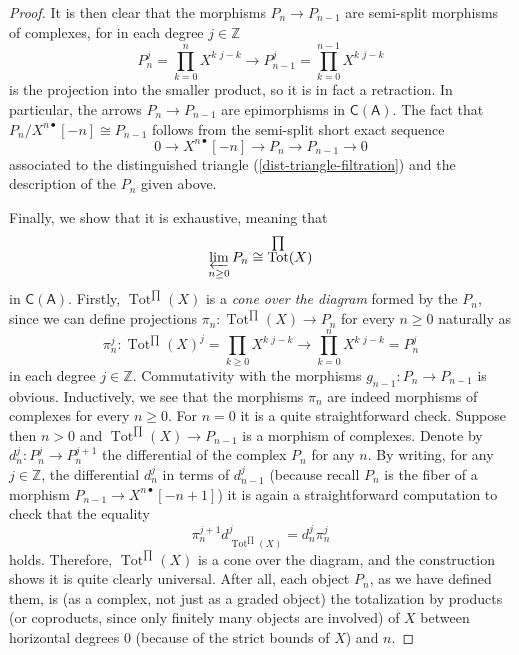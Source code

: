 \documentclass[reqno,11pt]{amsart}
\theoremstyle{plain}
\theoremstyle{remark}
\theoremstyle{definition}
\numberwithin{equation}{thm}
\newcommand{\SA}{\mathsf{A}}
\newcommand{\CCC}{\boldsymbol{\mathsf{C}}}
\newcommand{\ZZ}{\mathbb{Z}}
\newcommand{\lto}{\longrightarrow}
\DeclareMathOperator{\Tot}{Tot}
\begin{document}
\begin{proof}
		It is then clear that the morphisms $P_n \to P_{n-1}$ are semi-split morphisms of complexes, for in each degree $j \in \ZZ$
		\[
			P_n^j = \prod_{k=0}^{n} X^{k \,\, j-k} \lto P_{n-1}^j = \prod_{k=0}^{n-1} X^{k \,\, j-k}
		\]is the projection into the smaller product, so it is in fact a retraction. In particular, the arrows $P_n \to P_{n-1}$ are epimorphisms in $\CCC(\SA)$. The fact that $P_n/X^{n\bullet} [-n] \cong P_{n-1}$ follows from the semi-split short exact sequence 
		\[
		 0 \lto X^{n \bullet}[-n] \lto P_n \lto P_{n-1} \lto 0
		\]
		associated to the distinguished triangle (\ref{dist-triangle-filtration})
		and the description of the $P_n$ given above.
		
		Finally, we show that it is exhaustive, meaning that
		\[
			\varprojlim_{n \geq 0} P_n \cong \Tot^{\prod}(X)
		\]
		in $\CCC(\SA)$. Firstly, $\Tot^{\prod}(X)$ is a \textit{cone over the diagram} formed by the $P_n$, since we can define projections $\pi_n \colon \Tot^{\prod}(X) \to P_n$ for every $n \geq 0$ naturally as
		\[
			\pi_n^j \colon \Tot^{\prod}(X)^{j} = \prod_{k \geq 0} X^{k \,\,j-k} \lto \prod_{k=0}^{n} X^{k \,\,j-k} = P_n^j
		\]
		in each degree $j \in \ZZ$. Commutativity with the morphisms $g_{n-1} \colon P_n \to P_{n-1}$ is obvious. Inductively, we see that the morphisms $\pi_n$ are indeed morphisms of complexes for every $n \geq 0$. For $n=0$ it is a quite straightforward check. Suppose then $n > 0$ and $\Tot^{\prod}(X) \to P_{n-1}$ is a morphism of complexes. Denote by $d_{n}^j \colon P_{n}^j \to P_{n}^{j+1}$ the differential of the complex $P_n$ for any $n$. By writing, for any $j \in \ZZ$, the differential $d_n^j$ in terms of $d_{n-1}^j$ (because recall $P_n$ is the fiber of a morphism $P_{n-1} \to X^{n \bullet}[-n+1]$) it is again a straightforward computation to check that the equality 
		\[
			\pi_{n}^{j+1} d_{\Tot^{\prod}(X)}^j = d_{n}^j \pi_n^j
		\]
		holds. Therefore, $\Tot^{\prod}(X)$ is a cone over the diagram, and the construction shows it is quite clearly universal. After all, each object $P_n$, as we have defined them, is (as a complex, not just as a graded object) the totalization by products (or coproducts, since only finitely many objects are involved) of $X$ between horizontal degrees $0$ (because of the strict bounds of $X$) and $n$.
	\end{proof}
	
\end{document}
